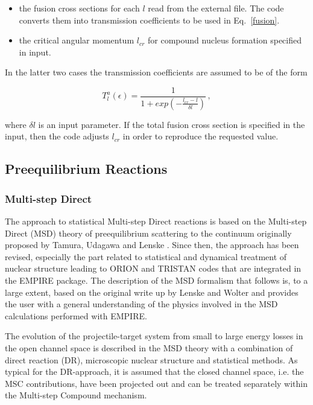 \documentclass[twocolumn,amsmath,amssymb,10pt,groupedaddress,letter]{revtex4}
\begin{document}
\begin{itemize}
\item the fusion cross sections for each $l$ read from the external
file. The code converts them into transmission
coefficients to be used in Eq.~\ref{fusion}. \\
\item the critical angular momentum $l_{cr}$ for compound nucleus
formation specified in input.
\end{itemize}

In the latter two cases the transmission coefficients are assumed
to be of the form

\begin{equation}
T_{l}^{a}(\epsilon)=\frac{1}{1+exp(-\frac{l_{cr}-l}{\delta l})}\,,\label{Tlfus}
\end{equation}

\noindent where $\delta l$ is an input parameter. If the total fusion
cross section is specified in the input, then the code adjusts $l_{cr}$
in order to reproduce the requested value.


\subsection{Preequilibrium Reactions}

\subsubsection{Multi-step Direct\label{sec: MSD}}


The approach to statistical Multi-step Direct reactions
is based on the Multi-step Direct (MSD) theory of preequilibrium scattering
to the continuum originally proposed by Tamura, Udagawa and Lenske
\cite{TUL}. Since then, the approach has been revised, especially
the part related to statistical and dynamical treatment of nuclear
structure leading to ORION and TRISTAN codes that are integrated in
the EMPIRE package. The description of the MSD formalism that follows
is, to a large extent, based on the original write up by Lenske and Wolter and
provides the user with a general understanding of the physics involved
in the MSD calculations performed with EMPIRE.

The evolution of the projectile-target system from small to large
energy losses in the open channel space is described in the MSD theory
with a combination of direct reaction (DR), microscopic nuclear structure
and statistical methods. As typical for the DR-approach, it is assumed
that the closed channel space, i.e. the MSC contributions,
have been projected out and can be treated separately within the Multi-step
Compound mechanism.
\end{document}
